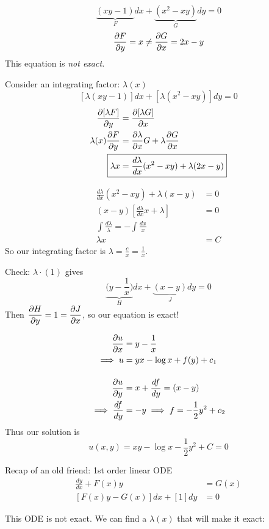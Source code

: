 \documentclass[10pt]{scrartcl}
\begin{document}
\begin{example}
	\[\underbrace{(xy - 1)}_{F}dx + \underbrace{(x^2 -xy)}_{G}dy = 0\]
	\[\frac{\partial F}{\partial y} = x \neq \frac{\partial G}{\partial x} = 2x-y\]
	This equation is \emph{not exact.}
	
	Consider an integrating factor: $\lambda(x)$
	\[[\lambda(xy-1)]dx + [\lambda(x^2-xy)]dy = 0\]
	\[
\begin{aligned}
  \frac{\del[\lambda F]}{\del y} &= \frac{\del[\lambda G]}{\del x}\\
  \lambda(x)\frac{\del F}{\del y} &= \frac{\del \lambda}{\del x}G + \lambda\frac{\del G}{\del x}\\
\Aboxed{  \lambda x &= \frac{d\lambda}{dx}(x^2-xy) + \lambda(2x-y)}
\end{aligned}
\]

\[
\begin{aligned}
  \frac{d\lambda}{dx}(x^2-xy) + \lambda(x-y) &= 0\\
  (x-y)\left[\frac{d\lambda}{dx}x+\lambda\right] &= 0\\
  \int \frac{d\lambda}\lambda = -\int \frac{dx}x\\
  \lambda x &= C
\end{aligned}
\]
So our integrating factor is $\lambda = \frac{c}{x} = \frac{1}{x}$.

Check: $\lambda\cdot (1)$ gives 
\[\underbrace{(y-\textstyle{\frac{1}{x})}}_{H}dx + \underbrace{(x-y)}_{J}dy = 0\]
Then $\dfrac{\partial H}{\partial y} = 1 = \dfrac{\partial J}{\partial x}$, so our equation is exact!

\[
\begin{aligned}
  \frac{\partial u}{\partial x} &= y -\frac{1}{x}\\
 \implies  u &= yx - \log x + f(y) + c_1\\[0.4cm]
  \frac{\partial u}{\partial y} &= x + \frac{df}{dy} = (x-y)\\
  \implies \frac{df}{dy} &= -y \implies f = -\frac{1}{2}y^2 + c_2
\end{aligned}
\]
Thus our solution is 
\[u(x,y) = xy - \log x -\frac{1}{2}y^2 + C = 0\]


\end{example}


Recap of an old friend: 1st order linear ODE
\[
\begin{aligned}
  \frac{dy}{dx} + F(x)y &= G(x)\\
  [F(x)y - G(x)]dx + [1]dy &= 0
\end{aligned}
\]

This ODE is not exact. We can find a $\lambda(x)$ that will make it exact:
\end{document}
